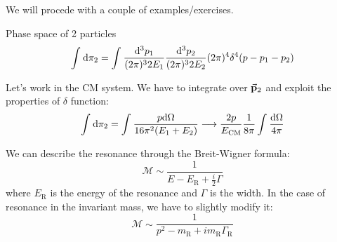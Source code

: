 \documentclass[../../main/main.tex]{subfiles}
\begin{document}
We will procede with a couple of examples/exercises.
\begin{example}{Phase space of 2 particles}{}
    \begin{equation}
        \int_{}^{} \mathrm{d}{\pi_2}
        =
        \int_{}^{} \frac{\mathrm{d}{^3 p_1}}{(2\pi)^3 2 E_1} \frac{\mathrm{d}{^3 p_2}}{(2\pi)^3 2 E_2} (2\pi)^4 \delta^4 \qty(p - p_1 - p_2 )
        \label{eq:}
    \end{equation}

    Let's work in the CM system. We have to integrate over \( \va{p}_2 \) and exploit the properties of \( \delta \) function:
    \begin{equation}
        \int_{}^{} \mathrm{d}{\pi_2}
        =
        \int_{}^{} \frac{p \mathrm{d}{\Omega}}{16 \pi^2 (E_1 + E_2)}
        \longrightarrow
        \frac{2p}{E_\mathrm{CM}} \frac{1}{8\pi} \int_{}^{} \frac{\mathrm{d}{\Omega}}{4\pi}
        \label{eq:}
    \end{equation}

    We can describe the resonance through the Breit-Wigner formula:
    \begin{equation}
        \mathcal{M}
        \sim
        \frac{1}{E - E_\mathrm{R} + \frac{i}{2} \Gamma}
        \label{eq:}
    \end{equation}
    where \( E_\mathrm{R} \) is the energy of the resonance and \( \Gamma \) is the width. In the case of resonance in the invariant mass, we have to slightly modify it:
    \begin{equation}
        \mathcal{M}
        \sim
        \frac{1}{p^2 - m_\mathrm{R} + i m_\mathrm{R}\Gamma_\mathrm{R}}
        \label{eq:}
    \end{equation}
\end{example}
\end{document}

